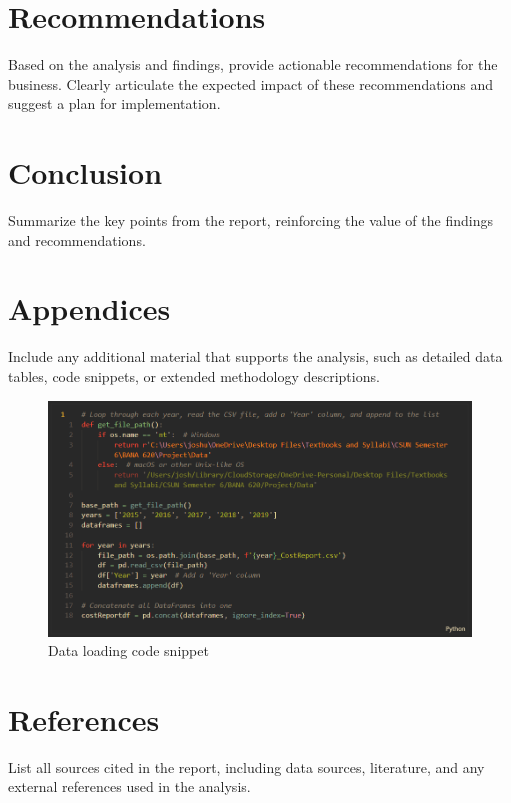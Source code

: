 \documentclass{article}
\theoremstyle{mytheoremstyle}
\theoremstyle{mytheoremstyle}
\theoremstyle{myproblemstyle}
\begin{document}
\pagebreak
\section{Recommendations}
Based on the analysis and findings, provide actionable recommendations for the business. Clearly articulate the expected impact of these recommendations and suggest a plan for implementation.

\pagebreak
\section{Conclusion}
Summarize the key points from the report, reinforcing the value of the findings and recommendations.

\pagebreak
\section{Appendices}
Include any additional material that supports the analysis, such as detailed data tables, code snippets, or extended methodology descriptions.

\begin{figure}[htbp]
\centering
\includegraphics[width=\linewidth]{./Images/dataLoadingSnippet.png}
\caption{Data loading code snippet}
\label{fig:screenshot_label}
\end{figure}


\pagebreak
\section{References}
List all sources cited in the report, including data sources, literature, and any external references used in the analysis.

\end{document}
